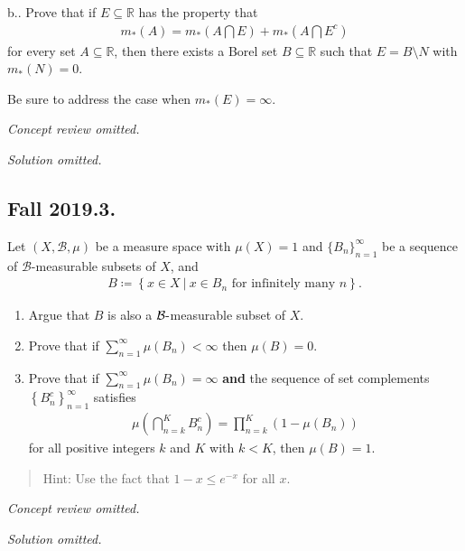 b.. Prove that if \(E\subseteq {\mathbb{R}}\) has the property that
\begin{align*}
m_*(A) = m_*(A\displaystyle\bigcap E) + m_*(A\displaystyle\bigcap E^c)
\end{align*}
for every set \(A\subseteq {\mathbb{R}}\), then there exists a Borel set
\(B\subseteq {\mathbb{R}}\) such that \(E = B\setminus N\) with
\(m_*(N) = 0\).

Be sure to address the case when \(m_*(E) = \infty\).

\emph{Concept review omitted.}

\emph{Solution omitted.}

\hypertarget{fall-2019.3.}{%
\subsection{Fall 2019.3.}\label{fall-2019.3.}}

Let \((X, \mathcal B, \mu)\) be a measure space with \(\mu(X) = 1\) and
\(\{B_n\}_{n=1}^\infty\) be a sequence of \(\mathcal B\)-measurable
subsets of \(X\), and
\begin{align*}
B \coloneqq\left\{{x\in X {~\mathrel{\Big\vert}~}x\in B_n \text{ for infinitely many } n}\right\}.
\end{align*}

\begin{enumerate}
\def\labelenumi{\alph{enumi}.}
\item
  Argue that \(B\) is also a \(\mathcal{B} {\hbox{-}}\)measurable subset
  of \(X\).
\item
  Prove that if \(\sum_{n=1}^\infty \mu(B_n) < \infty\) then
  \(\mu(B)= 0\).
\item
  Prove that if \(\sum_{n=1}^\infty \mu(B_n) = \infty\) \textbf{and} the
  sequence of set complements \(\left\{{B_n^c}\right\}_{n=1}^\infty\)
  satisfies
  \begin{align*}
  \mu\left(\bigcap_{n=k}^{K} B_{n}^{c}\right)=\prod_{n=k}^{K}\left(1-\mu\left(B_{n}\right)\right)
  \end{align*}
  for all positive integers \(k\) and \(K\) with \(k < K\), then
  \(\mu(B) = 1\).
\end{enumerate}

\begin{quote}
Hint: Use the fact that \(1 - x ≤ e^{-x}\) for all \(x\).
\end{quote}

\emph{Concept review omitted.}

\emph{Solution omitted.}

